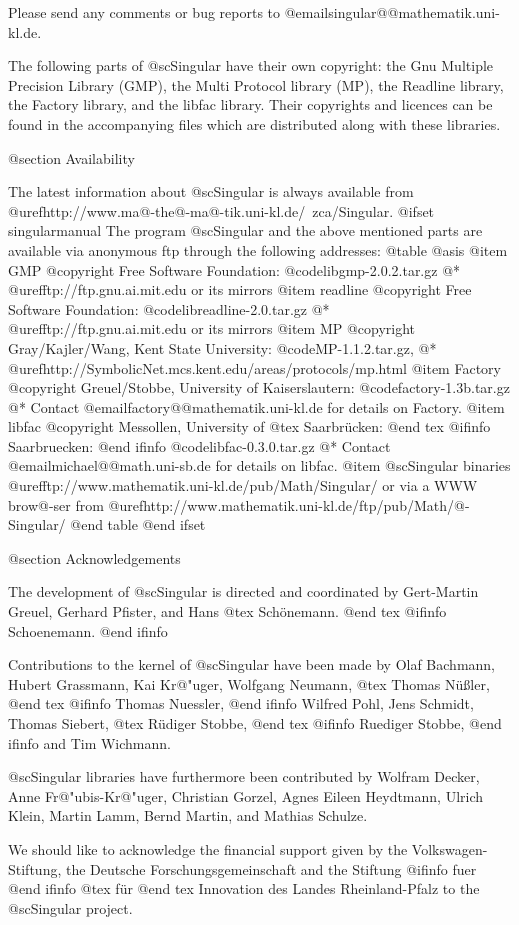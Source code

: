 Please send any comments or bug reports to
@email{singular@@mathematik.uni-kl.de}.

The following parts of @sc{Singular} have their own copyright: the Gnu Multiple
Precision Library (GMP), the Multi Protocol library (MP), the Readline library,
the Factory library, and the libfac library.
Their copyrights and licences can be found in the accompanying files
which are distributed along with these libraries.

@section Availability

The latest information about @sc{Singular} is always available from
@uref{http://www.ma@-the@-ma@-tik.uni-kl.de/~zca/Singular}.
@ifset singularmanual
The program @sc{Singular} and the above mentioned parts are available via
anonymous ftp through the following addresses:
@table @asis
@item GMP
@copyright{} Free Software Foundation:
@code{libgmp-2.0.2.tar.gz}
@* @uref{ftp://ftp.gnu.ai.mit.edu} or its mirrors
@item readline
@copyright{} Free Software Foundation:
@code{libreadline-2.0.tar.gz}
@* @uref{ftp://ftp.gnu.ai.mit.edu} or its mirrors
@item MP
@copyright{} Gray/Kajler/Wang, Kent State University:
@code{MP-1.1.2.tar.gz},
@* @uref{http://SymbolicNet.mcs.kent.edu/areas/protocols/mp.html}
@item Factory
@copyright{} Greuel/Stobbe, University of Kaiserslautern:
@code{factory-1.3b.tar.gz}
@* Contact @email{factory@@mathematik.uni-kl.de} for details on Factory.
@item libfac
@copyright{}  Messollen, University of
@tex
Saarbr\"ucken:
@end tex
@ifinfo
Saarbruecken:
@end ifinfo
@code{libfac-0.3.0.tar.gz}
@* Contact @email{michael@@math.uni-sb.de} for details on libfac.
@item @sc{Singular} binaries
@uref{ftp://www.mathematik.uni-kl.de/pub/Math/Singular/} or via a
WWW brow@-ser from
@uref{http://www.mathematik.uni-kl.de/ftp/pub/Math/@-Singular/}
@end table
@end ifset

@section Acknowledgements

The development of @sc{Singular} is directed and coordinated by
Gert-Martin Greuel, Gerhard Pfister, and Hans
@tex
Sch\"onemann.
@end tex
@ifinfo
Schoenemann.
@end ifinfo

Contributions to the kernel of @sc{Singular} have been made by
Olaf Bachmann,
Hubert Grassmann,
Kai Kr@"uger,
Wolfgang Neumann,
@tex
Thomas N\"u{\ss}ler,
@end tex
@ifinfo
Thomas Nuessler,
@end ifinfo
Wilfred Pohl,
Jens Schmidt,
Thomas Siebert,
@tex
R\"udiger Stobbe,
@end tex
@ifinfo
Ruediger Stobbe,
@end ifinfo
and
Tim Wichmann.

@sc{Singular} libraries have furthermore been contributed by
Wolfram Decker,
Anne Fr@"ubis-Kr@"uger,
Christian Gorzel,
Agnes Eileen Heydtmann,
Ulrich Klein,
Martin Lamm,
Bernd Martin,
and
Mathias Schulze.

We should like to acknowledge the financial support given by
the Volkswagen-Stiftung,
the Deutsche Forschungsgemeinschaft
and the Stiftung
@ifinfo
fuer
@end ifinfo
@tex
f\"ur
@end tex
Innovation des Landes Rheinland-Pfalz
to the
@sc{Singular} project.


